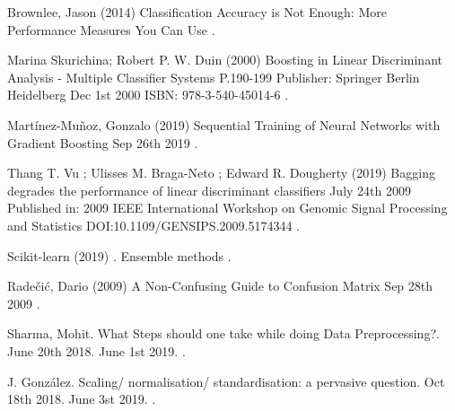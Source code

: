 \documentclass{article}
\begin{document}
  


\begin{thebibliography}{1}


Brownlee, Jason
\newblock (2014)
\newblock Classification Accuracy is Not Enough: More Performance Measures You Can Use
.

Marina Skurichina; Robert P. W. Duin
\newblock (2000)
\newblock Boosting in Linear Discriminant Analysis - Multiple Classifier Systems
\newblock P.190-199
\newblock Publisher: Springer Berlin Heidelberg
\newblock Dec 1st 2000
\newblock ISBN: 978-3-540-45014-6
.

Martínez-Muñoz, Gonzalo
\newblock (2019)
\newblock Sequential Training of Neural Networks with Gradient Boosting
\newblock Sep 26th  2019
.

Thang T. Vu ; Ulisses M. Braga-Neto ; Edward R. Dougherty
\newblock (2019)
\newblock Bagging degrades the performance of linear discriminant classifiers
\newblock July 24th 2009
\newblock Published in: 2009 IEEE International Workshop on Genomic Signal Processing and Statistics
\newblock DOI:10.1109/GENSIPS.2009.5174344
.

Scikit-learn
\newblock (2019)
. Ensemble methods
.

Radečić, Dario 
\newblock (2009)
\newblock A Non-Confusing Guide to Confusion Matrix
\newblock Sep 28th 2009
.
 

Sharma, Mohit.
\newblock What Steps should one take while doing Data Preprocessing?.
\newblock June 20th 2018.
\newblock June 1st 2019.
.

J. González.
\newblock Scaling/ normalisation/ standardisation: a pervasive question.
\newblock Oct 18th 2018.
\newblock June 3st 2019.
.
  

\end{thebibliography}


\end{document}
